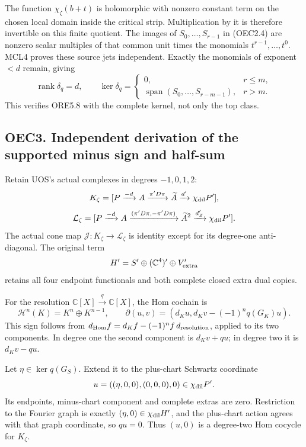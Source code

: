 The function \(\chi_\zeta(b+t)\) is holomorphic with nonzero constant
term on the chosen local domain inside the critical strip.
Multiplication by it is therefore invertible on this finite quotient.
The images of \(S_0,\ldots,S_{r-1}\) in (OEC2.4) are nonzero scalar
multiples of that common unit times the monomials
\(t^{r-1},\ldots,t^0\). MCL4 proves these source jets independent.
Exactly the monomials of exponent \(<d\) remain, giving \[
 \operatorname{rank}\delta_q=d,\qquad
 \ker\delta_q=
 \begin{cases}
 0,&r\le m,\\
 \operatorname{span}(S_0,\ldots,S_{r-m-1}),&r>m.
 \end{cases}
 \tag{OEC2.5}
\] This verifies ORE5.8 with the complete kernel, not only the top
class.

\subsection{OEC3. Independent derivation of the supported minus sign and
half-sum}\label{oec3.-independent-derivation-of-the-supported-minus-sign-and-half-sum}

Retain UOS's actual complexes in degrees \(-1,0,1,2\): \[
 K_\zeta=[P\xrightarrow{-d}A
 \xrightarrow{\pi'D\pi}\widetilde A
 \xrightarrow{d'}\chi_{\rm dil}P'],
\] \[
 \mathcal L_\zeta=[P\xrightarrow{-d}A
 \xrightarrow{(\pi'D\pi,-\pi'D\pi)}\widetilde A^2
 \xrightarrow{d_Z'}\chi_{\rm dil}P'].
\] The actual cone map \(\mathcal J:K_\zeta\to\mathcal L_\zeta\) is
identity except for its degree-one anti-diagonal. The original term \[
 H'=S'\oplus(\mathbb C^4)'\oplus V_{\rm extra}'
\] retains all four endpoint functionals and both complete closed extra
dual copies.

For the resolution \(\mathbb C[X]\xrightarrow{q}\mathbb C[X]\), the Hom
cochain is \[
 \mathscr H^n(K)=K^n\oplus K^{n-1},\qquad
 \partial(u,v)=
 (d_Ku,d_Kv-(-1)^nq(G_K)u).
 \tag{OEC3.1}
\] This sign follows from
\(d_{\rm Hom}f=d_Kf-(-1)^nf\,d_{\rm resolution}\), applied to its two
components. In degree one the second component is \(d_Kv+qu\); in degree
two it is \(d_Kv-qu\).

Let \(\eta\in\ker q(G_S)\). Extend it to the plus-chart Schwartz
coordinate \[
 u=((\eta,0,0),(0,0,0),0)\in\chi_{\rm dil}P'.
\] Its endpoints, minus-chart component and complete extras are zero.
Restriction to the Fourier graph is exactly
\((\eta,0)\in\chi_{\rm dil}H'\), and the plus-chart action agrees with
that graph coordinate, so \(qu=0\). Thus \((u,0)\) is a degree-two Hom
cocycle for \(K_\zeta\).

